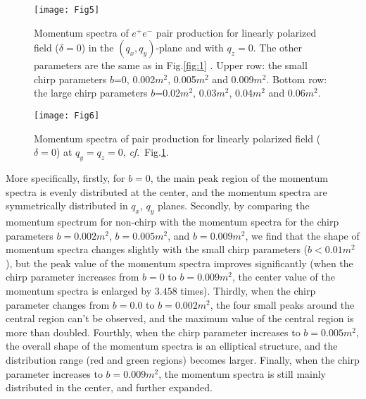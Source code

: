 \documentclass[aps,preprint,superscriptaddress]{revtex4}
\begin{document}
\begin{figure}[ht]%
\begin{center}
\texttt{[image: Fig5]}
\end{center}
\vspace{-10mm}
\caption{Momentum spectra of $e^{+}e^{-}$ pair production for linearly polarized field ($\delta=0$) in the $( q _x,q_y)$-plane and with $q_z=0$. The other parameters are the same as in Fig.\ref{fig:1} .
Upper row: the small chirp parameters $b$=0, 0.002$m^2$, 0.005$m^2$ and 0.009$m^2$. Bottom row: the large chirp parameters $b$=0.02$m^2$, 0.03$m^2$, 0.04$m^2$ and 0.06$m^2$.}
\label{fig:4}
\end{figure}


\begin{figure}[ht]%
\begin{center}
\texttt{[image: Fig6]}
\end{center}
\vspace{-10mm}
\caption{Momentum spectra of pair production for linearly polarized field ($\delta=0$)
at $q_y=q_z=0$, {\it cf}.\ Fig.\ref{fig:4}. }
\label{fig:5}
\end{figure}

More specifically, firstly, for $b=0$, the main peak region of the momentum spectra is evenly distributed at the center, and the momentum spectra are symmetrically distributed in $q_x$, $q_y$ planes. Secondly, by comparing the momentum spectrum for non-chirp with the momentum spectra for the chirp parameters $b=0.002$$m^2$, $b=0.005$$m^2$, and $b=0.009$$m^2$, we find that the shape of momentum spectra changes slightly with the small chirp parameters ($b<0.01$$m^2$), but the peak value of the momentum spectra improves significantly (when the chirp parameter increases from $b=0$ to $b=0.009$$m^2$, the center value of the momentum spectra is enlarged by $3.458$ times). Thirdly, when the chirp parameter changes from $b=0.0$ to $b=0.002$$m^2$, the four small peaks around the central region can't be observed, and the maximum value of the central region is more than doubled. Fourthly, when the chirp parameter increases to $b=0.005$$m^2$, the overall shape of the momentum spectra is an elliptical structure, and the distribution range (red and green regions) becomes larger. Finally, when the chirp parameter increases to $b=0.009$$m^2$, the momentum spectra is still mainly distributed in the center, and further expanded.
\end{document}
